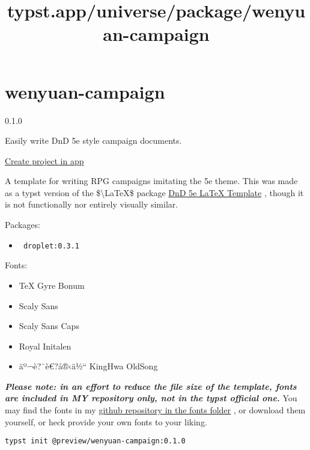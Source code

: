\title{typst.app/universe/package/wenyuan-campaign}

\label{banner}
\label{template-thumbnail}

\section{wenyuan-campaign}\label{wenyuan-campaign}

{ 0.1.0 }

Easily write DnD 5e style campaign documents.

\href{/app?template=wenyuan-campaign&version=0.1.0}{Create project in
app}

\label{readme}
A template for writing RPG campaigns imitating the 5e theme. This was
made as a typst version of the \$\textbackslash LaTeX\$ package
\href{https://github.com/rpgtex/DND-5e-LaTeX-Template}{DnD 5e LaTeX
Template} , though it is not functionally nor entirely visually similar.

Packages:

\begin{itemize}
\tightlist
\item
  \texttt{\ droplet:0.3.1\ }
\end{itemize}

Fonts:

\begin{itemize}
\tightlist
\item
  TeX Gyre Bonum
\item
  Scaly Sans
\item
  Scaly Sans Caps
\item
  Royal Initalen
\item
  äº¬è?¯è€?å®‹ä½`` KingHwa OldSong
\end{itemize}

\emph{\textbf{Please note: in an effort to reduce the file size of the
template, fonts are included in MY repository only, not in the typst
official one.}} You may find the fonts in my
\href{https://github.com/yanwenywan/typst-packages/tree/master/wenyuan-campaign/0.1.0/template/fonts}{github
repository in the fonts folder} , or download them yourself, or heck
provide your own fonts to your liking.

\begin{verbatim}
typst init @preview/wenyuan-campaign:0.1.0
\end{verbatim}

